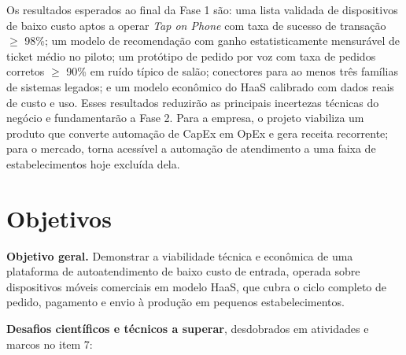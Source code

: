 \documentclass[12pt,a4paper]{article}
\begin{document}
Os resultados esperados ao final da Fase 1 são: uma lista validada de dispositivos de baixo custo aptos a operar \textit{Tap on Phone} com taxa de sucesso de transação $\geq$ 98\%; um modelo de recomendação com ganho estatisticamente mensurável de ticket médio no piloto; um protótipo de pedido por voz com taxa de pedidos corretos $\geq$ 90\% em ruído típico de salão; conectores para ao menos três famílias de sistemas legados; e um modelo econômico do HaaS calibrado com dados reais de custo e uso. Esses resultados reduzirão as principais incertezas técnicas do negócio e fundamentarão a Fase 2. Para a empresa, o projeto viabiliza um produto que converte automação de CapEx em OpEx e gera receita recorrente; para o mercado, torna acessível a automação de atendimento a uma faixa de estabelecimentos hoje excluída dela.

\clearpage

\section{Objetivos}

\textbf{Objetivo geral.} Demonstrar a viabilidade técnica e econômica de uma plataforma de autoatendimento de baixo custo de entrada, operada sobre dispositivos móveis comerciais em modelo HaaS, que cubra o ciclo completo de pedido, pagamento e envio à produção em pequenos estabelecimentos.

\textbf{Desafios científicos e técnicos a superar}, desdobrados em atividades e marcos no item 7:
\end{document}
